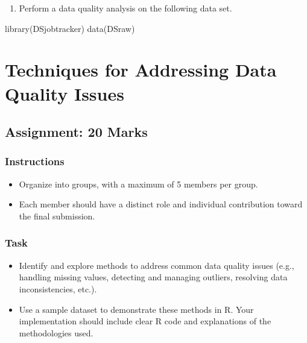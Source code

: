 \documentclass[
  letterpaper,
  DIV=11,
  numbers=noendperiod]{scrreprt}
\newenvironment{Shaded}{\begin{snugshade}}{\end{snugshade}}
\newcommand{\FunctionTok}[1]{\textcolor[rgb]{0.28,0.35,0.67}{#1}}
\newcommand{\NormalTok}[1]{\textcolor[rgb]{0.00,0.23,0.31}{#1}}
\providecommand{\tightlist}{%
  \setlength{\itemsep}{0pt}\setlength{\parskip}{0pt}}\usepackage{longtable,booktabs,array}
\begin{document}
\begin{enumerate}
\def\labelenumi{\arabic{enumi}.}
\setcounter{enumi}{3}
\tightlist
\item
  Perform a data quality analysis on the following data set.
\end{enumerate}

\begin{Shaded}
\begin{Highlighting}[]
\FunctionTok{library}\NormalTok{(DSjobtracker)}
\FunctionTok{data}\NormalTok{(DSraw)}
\end{Highlighting}
\end{Shaded}


\chapter{Techniques for Addressing Data Quality
Issues}\label{techniques-for-addressing-data-quality-issues}

\section{Assignment: 20 Marks}\label{assignment-20-marks}

\subsection{Instructions}\label{instructions}

\begin{itemize}
\item
  Organize into groups, with a maximum of 5 members per group.
\item
  Each member should have a distinct role and individual contribution
  toward the final submission.
\end{itemize}

\subsection{Task}\label{task}

\begin{itemize}
\item
  Identify and explore methods to address common data quality issues
  (e.g., handling missing values, detecting and managing outliers,
  resolving data inconsistencies, etc.).
\item
  Use a sample dataset to demonstrate these methods in R. Your
  implementation should include clear R code and explanations of the
  methodologies used.
\end{itemize}
\end{document}
